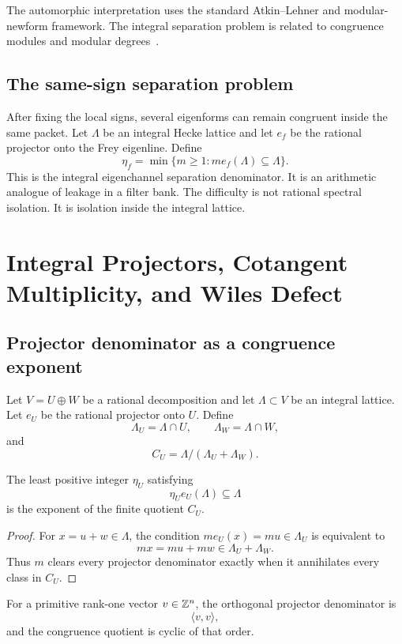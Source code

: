 The automorphic interpretation uses the standard Atkin--Lehner and modular-newform framework. The integral separation problem is related to congruence modules and modular degrees~\cite{Wiles,TaylorWiles,BCDT,Agashe,CesnaviciusManin}.

\section{The same-sign separation problem}
After fixing the local signs, several eigenforms can remain congruent inside the same packet. Let $\Lambda$ be an integral Hecke lattice and let $e_f$ be the rational projector onto the Frey eigenline. Define
\[
 \eta_f
 =
 \min\{m\ge1:m e_f(\Lambda)\subseteq\Lambda\}.
\]
This is the integral eigenchannel separation denominator. It is an arithmetic analogue of leakage in a filter bank. The difficulty is not rational spectral isolation. It is isolation inside the integral lattice.

\chapter{Integral Projectors, Cotangent Multiplicity, and Wiles Defect}

\section{Projector denominator as a congruence exponent}
Let $V=U\oplus W$ be a rational decomposition and let $\Lambda\subset V$ be an integral lattice. Let $e_U$ be the rational projector onto $U$. Define
\[
 \Lambda_U=\Lambda\cap U,
 \qquad
 \Lambda_W=\Lambda\cap W,
\]
and
\[
 C_U=\Lambda/(\Lambda_U+\Lambda_W).
\]

\begin{theorem}
The least positive integer $\eta_U$ satisfying
\[
 \eta_U e_U(\Lambda)\subseteq\Lambda
\]
is the exponent of the finite quotient $C_U$.
\end{theorem}

\begin{proof}
For $x=u+w\in\Lambda$, the condition $m e_U(x)=mu\in\Lambda_U$ is equivalent to
\[
 mx=mu+mw\in\Lambda_U+\Lambda_W.
\]
Thus $m$ clears every projector denominator exactly when it annihilates every class in $C_U$.
\end{proof}

For a primitive rank-one vector $v\in\mathbb Z^n$, the orthogonal projector denominator is
\[
 \langle v,v\rangle,
\]
and the congruence quotient is cyclic of that order.

